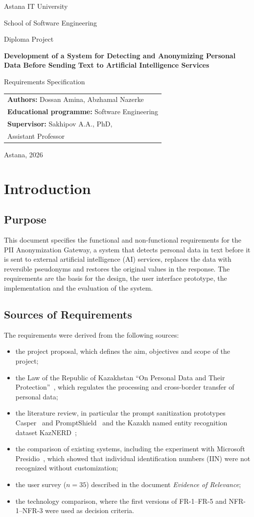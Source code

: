\documentclass[12pt,a4paper]{article}
\makeatletter
\newcommand{\maketitlepage}[1]{%
\begin{titlepage}
\centering
{\large Astana IT University\par}
{\normalsize School of Software Engineering\par}
\vspace{4.5cm}
{\normalsize Diploma Project\par}
\vspace{0.6cm}
{\Large\bfseries Development of a System for Detecting and Anonymizing Personal Data Before Sending Text to Artificial Intelligence Services\par}
\vspace{1.2cm}
{\LARGE #1\par}
\vfill
\begin{flushright}
\begin{tabular}{@{}l@{}}
\textbf{Authors:} Dossan Amina, Abzhamal Nazerke\\
\textbf{Educational programme:} Software Engineering\\
\textbf{Supervisor:} Sakhipov A.A., PhD,\\ \hspace{2.2cm}Assistant Professor
\end{tabular}
\end{flushright}
\vspace{2.5cm}
{\normalsize Astana, 2026\par}
\end{titlepage}
\setcounter{page}{2}}
\makeatother
\begin{document}
\maketitlepage{Requirements Specification}

\tableofcontents
\newpage

\section{Introduction}

\subsection{Purpose}

This document specifies the functional and non-functional requirements for the PII Anonymization Gateway, a system that detects personal data in text before it is sent to external artificial intelligence (AI) services, replaces the data with reversible pseudonyms and restores the original values in the response. The requirements are the basis for the design, the user interface prototype, the implementation and the evaluation of the system.

\subsection{Sources of Requirements}

The requirements were derived from the following sources:
\begin{itemize}
\item the project proposal, which defines the aim, objectives and scope of the project;
\item the Law of the Republic of Kazakhstan ``On Personal Data and Their Protection''~\cite{law}, which regulates the processing and cross-border transfer of personal data;
\item the literature review, in particular the prompt sanitization prototypes Casper~\cite{casper} and PromptShield~\cite{promptshield} and the Kazakh named entity recognition dataset KazNERD~\cite{kaznerd};
\item the comparison of existing systems, including the experiment with Microsoft Presidio~\cite{presidio}, which showed that individual identification numbers (IIN) were not recognized without customization;
\item the user survey ($n=35$) described in the document \emph{Evidence of Relevance};
\item the technology comparison, where the first versions of FR-1--FR-5 and NFR-1--NFR-3 were used as decision criteria.
\end{itemize}
\end{document}
